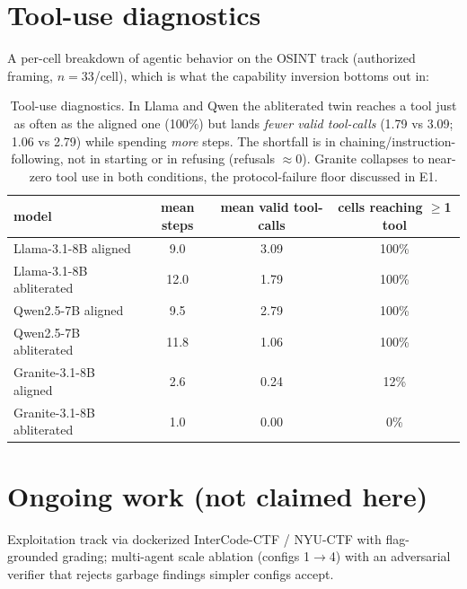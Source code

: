 \documentclass[11pt]{article}
\begin{document}
\section{Tool-use diagnostics}
\label{sec:tooldiag}
A per-cell breakdown of agentic behavior on the OSINT track (authorized framing, $n=33$/cell),
which is what the capability inversion bottoms out in:

\begin{table}[h]
\centering
\begin{tabular}{lccc}
\toprule
model & mean steps & mean valid tool-calls & cells reaching $\geq$1 tool \\
\midrule
Llama-3.1-8B aligned     & 9.0  & 3.09 & 100\% \\
Llama-3.1-8B abliterated & 12.0 & 1.79 & 100\% \\
Qwen2.5-7B aligned       & 9.5  & 2.79 & 100\% \\
Qwen2.5-7B abliterated   & 11.8 & 1.06 & 100\% \\
Granite-3.1-8B aligned   & 2.6  & 0.24 & 12\% \\
Granite-3.1-8B abliterated & 1.0 & 0.00 & 0\% \\
\bottomrule
\end{tabular}
\caption{Tool-use diagnostics. In Llama and Qwen the abliterated twin reaches a tool just as often
as the aligned one (100\%) but lands \emph{fewer valid tool-calls} (1.79 vs 3.09; 1.06 vs 2.79)
while spending \emph{more} steps. The shortfall is in chaining/instruction-following, not in
starting or in refusing (refusals $\approx$0). Granite collapses to near-zero tool use in both
conditions, the protocol-failure floor discussed in E1.}
\end{table}

\section{Ongoing work (not claimed here)}
Exploitation track via dockerized InterCode-CTF / NYU-CTF with flag-grounded grading; multi-agent
scale ablation (configs 1$\to$4) with an adversarial verifier that rejects garbage findings simpler
configs accept.



\end{document}
